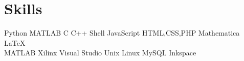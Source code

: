 \documentclass[hidelinks,letterpaper]{deedy-resume-openfont} %
\begin{document}
\begin{minipage}[t]{0.33\textwidth}
		\section{Skills}
		
		
		Python \textbullet{} MATLAB \textbullet{} C \textbullet{} C++ \textbullet{}
		Shell \textbullet{} JavaScript \textbullet{} HTML,CSS,PHP \textbullet{} Mathematica \textbullet{} \LaTeX\ \\ 
		MATLAB \textbullet{} Xilinx \textbullet{} Visual Studio \textbullet{} Unix \textbullet{} Linux \textbullet{} MySQL
		Inkspace
		\sectionsep
		
		
	\end{minipage} %
	\hfill
\end{document}

